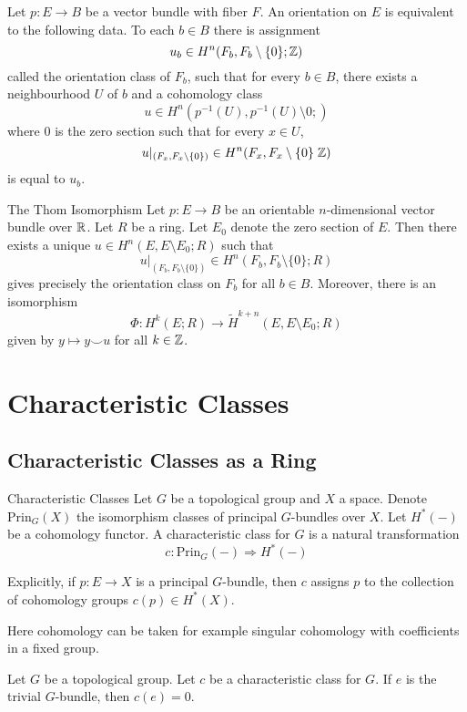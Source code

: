 \documentclass[a4paper]{article}
\begin{document}
\begin{thm}{}{} Let $p:E\to B$ be a vector bundle with fiber $F$. An orientation on $E$ is equivalent to the following data. To each $b\in B$ there is assignment $$u_b\in H^n(F_b,F_b\setminus\{0\};\mathbb{Z})$$ called the orientation class of $F_b$, such that for every $b\in B$, there exists a neighbourhood $U$ of $b$ and a cohomology class $$u\in H^n(p^{-1}(U),p^{-1}(U)\setminus 0;)$$ where $0$ is the zero section such that for every $x\in U$, $$u|_{(F_x,F_x\setminus\{0\})}\in H^n(F_x,F_x\setminus\{0\}\;\mathbb{Z})$$ is equal to $u_b$. 
\end{thm}

\begin{thm}{The Thom Isomorphism}{} Let $p:E\to B$ be an orientable $n$-dimensional vector bundle over $\mathbb{R}$. Let $R$ be a ring. Let $E_0$ denote the zero section of $E$. Then there exists a unique $u\in H^n(E,E\setminus E_0;R)$ such that $$u|_{(F_b,F_b\setminus\{0\})}\in H^n(F_b,F_b\setminus\{0\};R)$$ gives precisely the orientation class on $F_b$ for all $b\in B$. Moreover, there is an isomorphism $$\Phi:H^k(E;R)\to\widetilde{H}^{k+n}(E,E\setminus E_0;R)$$ given by $y\mapsto y\smile u$ for all $k\in\mathbb{Z}$. 
\end{thm}

\pagebreak
\section{Characteristic Classes}
\subsection{Characteristic Classes as a Ring}
\begin{defn}{Characteristic Classes}{} Let $G$ be a topological group and $X$ a space. Denote $\text{Prin}_G(X)$ the isomorphism classes of principal $G$-bundles over $X$. Let $H^\ast(-)$ be a cohomology functor. A characteristic class for $G$ is a natural transformation $$c:\text{Prin}_G(-)\Rightarrow H^\ast(-)$$

Explicitly, if $p:E\to X$ is a principal $G$-bundle, then $c$ assigns $p$ to the collection of cohomology groups $c(p)\in H^\ast(X)$. 
\end{defn}

Here cohomology can be taken for example singular cohomology with coefficients in a fixed group. 

\begin{lmm}{}{} Let $G$ be a topological group. Let $c$ be a characteristic class for $G$. If $e$ is the trivial $G$-bundle, then $c(e)=0$. 
\end{lmm}
\end{document}

